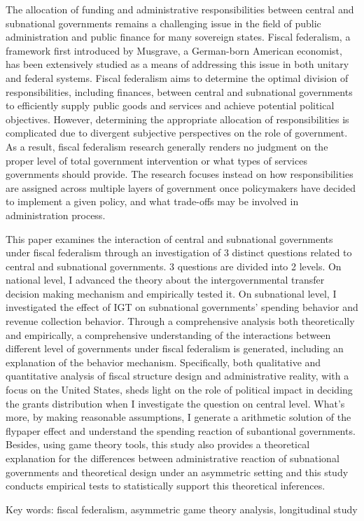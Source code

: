 
The allocation of funding and administrative responsibilities between central and subnational governments remains a challenging issue in the field of public administration and public finance for many sovereign states. Fiscal federalism, a framework first introduced by Musgrave, a German-born American economist, has been extensively studied as a means of addressing this issue in both unitary and federal systems. Fiscal federalism aims to determine the optimal division of responsibilities, including finances, between central and subnational governments to efficiently supply public goods and services and achieve potential political objectives. However, determining the appropriate allocation of responsibilities is complicated due to divergent subjective perspectives on the role of government. As a result, fiscal federalism research generally renders no judgment on the proper level of total government intervention or what types of services governments should provide. The research focuses instead on how responsibilities are assigned across multiple layers of government once policymakers have decided to implement a given policy, and what trade-offs may be involved in administration process.

This paper examines the interaction of central and subnational governments under fiscal federalism through an investigation of 3 distinct questions related to central and subnational governments. 3 questions are divided into 2 levels. On national level, I advanced the theory about the intergovernmental transfer decision making mechanism and empirically tested it. On subnational level, I investigated the effect of IGT on subnational governments' spending behavior and revenue collection behavior. Through a comprehensive analysis both theoretically and empirically, a comprehensive understanding of the interactions between different level of governments under fiscal federalism is generated, including an explanation of the behavior mechanism. Specifically, both qualitative and quantitative analysis of fiscal structure design and administrative reality, with a focus on the United States, sheds light on the role of political impact in deciding the grants distribution when I investigate the question on central level. What's more, by making reasonable assumptions, I generate a arithmetic solution of the flypaper effect and understand the spending reaction of subantional governments.  Besides, using game theory tools, this study also provides a theoretical explanation for the differences between administrative reaction of subnational governments and theoretical design under an asymmetric setting and this study conducts empirical tests to statistically support this theoretical inferences.

Key words: fiscal federalism, asymmetric game theory analysis, longitudinal study


\vspace{-0.3in}